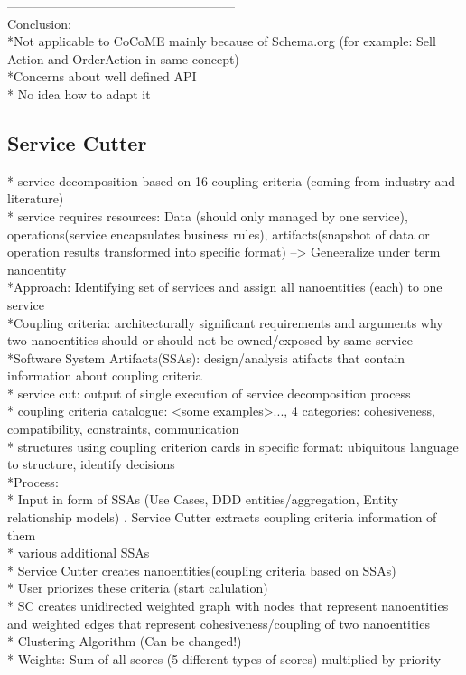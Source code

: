 ------------------------------------------------------\\

Conclusion:\\
*Not applicable to CoCoME mainly because of Schema.org (for example: Sell Action and OrderAction in same concept) \\
*Concerns about  well defined API\\
* No idea how to adapt it\\

\subsection{Service Cutter}

* service decomposition based on 16 coupling criteria (coming from industry and literature)\\
* service requires resources: Data (should only managed by one service), operations(service encapsulates business rules), artifacts(snapshot of data or operation results transformed into specific format) --> Geneeralize under term nanoentity\\
*Approach: Identifying set of services and assign all nanoentities (each) to one service\\
*Coupling criteria: architecturally significant requirements and arguments why two nanoentities should or should not be owned/exposed by same service\\
*Software System Artifacts(SSAs): design/analysis atifacts that contain information about coupling criteria\\
* service cut: output of single execution of service decomposition process\\
* coupling criteria catalogue:  <some examples>..., 4 categories: cohesiveness, compatibility, constraints, communication\\
* structures using coupling criterion cards in specific format: ubiquitous language to structure, identify decisions\\

*Process:\\
* Input in form of SSAs (Use Cases, DDD entities/aggregation, Entity relationship models) . Service Cutter extracts coupling criteria information of them\\
* various additional SSAs\\
* Service Cutter creates nanoentities(coupling criteria based on SSAs)\\
* User priorizes these criteria (start calulation)\\
* SC creates unidirected weighted graph with nodes that represent nanoentities and weighted edges that represent cohesiveness/coupling of two nanoentities\\
* Clustering Algorithm (Can be changed!)\\
* Weights: Sum of all scores (5 different types of scores) multiplied by priority\\

